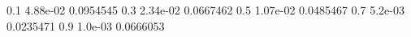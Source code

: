0.1 4.88e-02 0.0954545
0.3 2.34e-02 0.0667462
0.5 1.07e-02 0.0485467
0.7 5.2e-03 0.0235471
0.9 1.0e-03 0.0666053